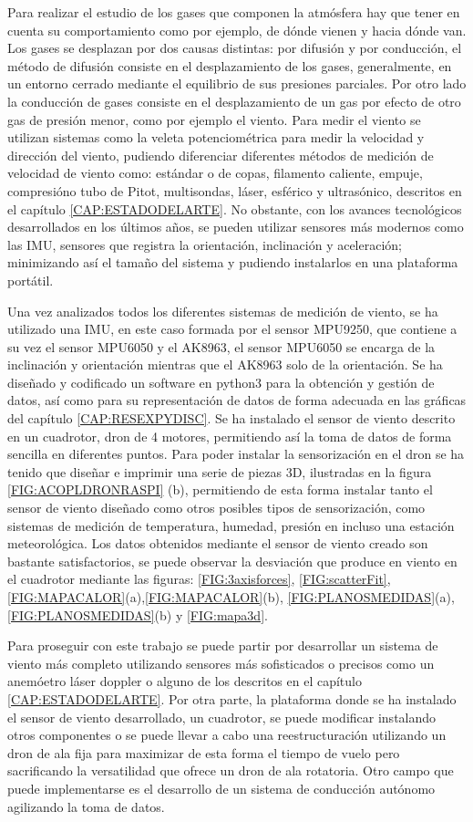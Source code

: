 
Para realizar el estudio de los gases que componen la atmósfera hay que tener en cuenta su comportamiento como por ejemplo, de dónde vienen y hacia dónde van. Los gases se desplazan por dos causas distintas: por difusión y por conducción, el método de difusión consiste en el desplazamiento de los gases, generalmente, en un entorno cerrado mediante el equilibrio de sus presiones parciales. Por otro lado la conducción de gases consiste en el desplazamiento de un gas por efecto de otro gas de presión menor, como por ejemplo el viento. Para medir el viento se utilizan sistemas como la veleta potenciométrica\cite{Mur2012} para medir la velocidad y dirección del viento, pudiendo diferenciar diferentes métodos de medición de velocidad de viento como: estándar o de copas, filamento caliente, empuje, compresióno tubo de Pitot, multisondas, láser, esférico y ultrasónico, descritos en el capítulo \ref{CAP:ESTADODELARTE}. No obstante, con los avances tecnológicos desarrollados en los últimos años, se pueden utilizar sensores más modernos  como las IMU, sensores que registra la orientación, inclinación y aceleración; minimizando así el tamaño del sistema y pudiendo instalarlos en una plataforma portátil.

Una vez analizados todos los diferentes sistemas de medición de viento, se ha utilizado una IMU, en este caso formada por el sensor MPU9250, que contiene a su vez el sensor MPU6050 y el AK8963, el sensor MPU6050 se encarga de la inclinación y orientación mientras que el AK8963 solo de la orientación. Se ha diseñado y codificado un software en python3 para la obtención y gestión de datos, así como para su representación de datos de forma adecuada en las gráficas del capítulo \ref{CAP:RESEXPYDISC}. Se ha instalado el sensor de viento descrito en un cuadrotor, dron de 4 motores, permitiendo así la toma de datos de forma sencilla en diferentes puntos. Para poder instalar la sensorización en el dron se ha tenido que diseñar e imprimir una serie de piezas 3D, ilustradas en la figura \ref{FIG:ACOPLDRONRASPI} (b), permitiendo de esta forma instalar tanto el sensor de viento diseñado como otros posibles tipos de sensorización, como sistemas de medición de temperatura, humedad, presión en incluso una estación meteorológica. Los datos obtenidos mediante el sensor de viento creado son bastante satisfactorios, se puede observar la desviación que produce en viento en el cuadrotor mediante las figuras: \ref{FIG:3axisforces}, \ref{FIG:scatterFit}, \ref{FIG:MAPACALOR}(a),\ref{FIG:MAPACALOR}(b), \ref{FIG:PLANOSMEDIDAS}(a), \ref{FIG:PLANOSMEDIDAS}(b) y \ref{FIG:mapa3d}.

Para proseguir con este trabajo se puede partir por desarrollar un sistema de viento más completo utilizando sensores más sofisticados o precisos como un anemóetro láser doppler o alguno de los descritos en el capítulo \ref{CAP:ESTADODELARTE}. Por otra parte, la plataforma donde se ha instalado el sensor de viento desarrollado, un cuadrotor, se puede modificar instalando otros componentes o se puede llevar a cabo una reestructuración utilizando un dron de ala fija para maximizar de esta forma el tiempo de vuelo pero sacrificando la versatilidad que ofrece un dron de ala rotatoria. Otro campo que puede implementarse es el desarrollo de un sistema de conducción autónomo agilizando la toma de datos.